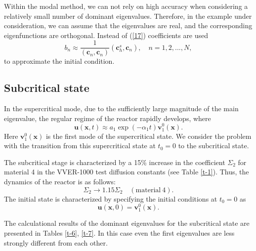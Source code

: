 \documentclass[authoryear]{elsarticle}
\begin{document}
Within the modal method, we can not rely on high accuracy when considering a relatively small number of dominant eigenvalues. Therefore, in the example under consideration, we can assume that the eigenvalues are real, and the corresponding eigenfunctions are orthogonal. Instead of (\ref{17}) coefficients are used 
\begin{equation}\label{24}
 b_n \approx  \frac{1}{(\bm c_n, \bm c_n)} (\bm c_h^s, \bm c_n),
 \quad n = 1,2, ..., N ,
\end{equation}
to approximate the initial condition.

\subsection{Subcritical state} 

In the supercritical mode, due to the sufficiently large magnitude of the main eigenvalue, the regular regime of the reactor rapidly develops, where 
\[
 \bm u (\bm x, t) \approx a_1 \exp(-\alpha_1 t) \bm v_1^0 (\bm x) .
\] 
Here  $\bm v_1^0 (\bm x)$ is the first mode of the supercritical state. We consider the problem with the transition from this supercritical state at  $t_0 = 0$  to the subcritical state.

The subcritical stage is characterized by a 15\% increase in the coefficient  
$\Sigma_2$ for material 4 in the VVER-1000 test diffusion constants (see Table  \ref{t-1}). 
Thus, the dynamics of the reactor is as follows: 
\[
 \Sigma_2 \longrightarrow 1.15 \Sigma_2 \quad (\mathrm{material} \ 4).
\] 
The initial state is characterized by specifying the initial conditions at $t_0 = 0$ as
\begin{equation}\label{25}
 \bm u (\bm x, 0) = \bm v_1^0 (\bm x) . 
\end{equation} 

The calculational results of  the dominant eigenvalues for the subcritical state are presented in Tables \ref{t-6}, \ref{t-7}. In this case even the first eigenvalues are less strongly different from each other. 
\end{document}
